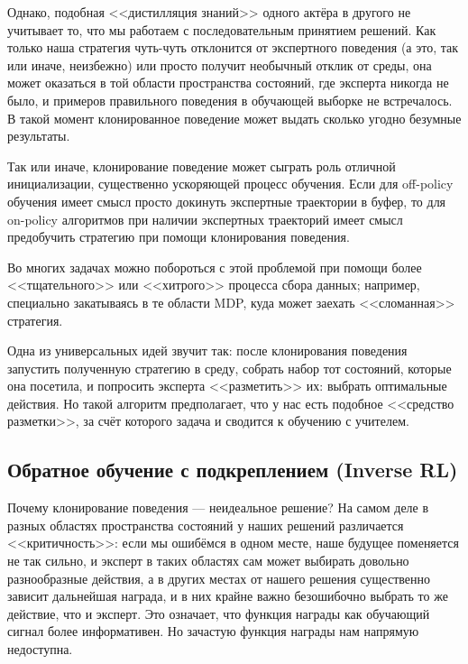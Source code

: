 Однако, подобная <<дистилляция знаний>> одного актёра в другого не учитывает то, что мы работаем с последовательным принятием решений. Как только наша стратегия чуть-чуть отклонится от экспертного поведения (а это, так или иначе, неизбежно) или просто получит необычный отклик от среды, она может оказаться в той области пространства состояний, где эксперта никогда не было, и примеров правильного поведения в обучающей выборке не встречалось. В такой момент клонированное поведение может выдать сколько угодно безумные результаты.

\begin{remark}
Так или иначе, клонирование поведение может сыграть роль отличной инициализации, существенно ускоряющей процесс обучения. Если для off-policy обучения имеет смысл просто докинуть экспертные траектории в буфер, то для on-policy алгоритмов при наличии экспертных траекторий имеет смысл предобучить стратегию при помощи клонирования поведения. 
\end{remark}

Во многих задачах можно побороться с этой проблемой при помощи более <<тщательного>> или <<хитрого>> процесса сбора данных; например, специально закатываясь в те области MDP, куда может заехать <<сломанная>> стратегия.

\begin{example}[DAgger]
Одна из универсальных идей звучит так: после клонирования поведения запустить полученную стратегию в среду, собрать набор тот состояний, которые она посетила, и попросить эксперта <<разметить>> их: выбрать оптимальные действия. Но такой алгоритм предполагает, что у нас есть подобное <<средство разметки>>, за счёт которого задача и сводится к обучению с учителем.
\end{example}


\subsection{Обратное обучение с подкреплением (Inverse RL)}\label{subsec_irl}

Почему клонирование поведения --- неидеальное решение? На самом деле в разных областях пространства состояний у наших решений различается <<критичность>>: если мы ошибёмся в одном месте, наше будущее поменяется не так сильно, и эксперт в таких областях сам может выбирать довольно разнообразные действия, а в других местах от нашего решения существенно зависит дальнейшая награда, и в них крайне важно безошибочно выбрать то же действие, что и эксперт. Это означает, что функция награды как обучающий сигнал более информативен. Но зачастую функция награды нам напрямую недоступна. 

